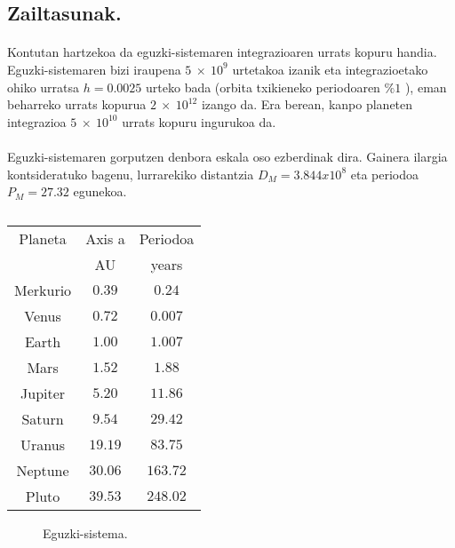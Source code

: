 \subsection{Zailtasunak.}

\paragraph*{} Kontutan hartzekoa da eguzki-sistemaren integrazioaren urrats kopuru handia. Eguzki-sistemaren bizi iraupena $5 \ \times \ 10^9$ urtetakoa izanik eta integrazioetako ohiko urratsa  $h=0.0025$ urteko bada (orbita txikieneko periodoaren $ \%1$ ), eman beharreko urrats kopurua $2 \ \times \ 10^{12}$ izango da. Era berean, kanpo planeten integrazioa $5 \ \times \ 10^{10}$ urrats kopuru ingurukoa da.     

\paragraph{} Eguzki-sistemaren gorputzen denbora eskala oso ezberdinak dira. Gainera ilargia kontsideratuko bagenu, lurrarekiko distantzia $D_M=3.844 x 10^8$ eta periodoa $P_M=27.32$ egunekoa. 

\begin{table} [h!]
\caption{}
\label{tab:1}       %
\begin{tabular}{c c c} 
\hline
 Planeta   &  Axis a        & Periodoa    \\   
           &   AU          &   years      \\ \hline
 Merkurio  &   $0.39$      &  $0.24$     \\
 Venus     &   $0.72$      &  $0.007$    \\
 Earth     &   $1.00$      &  $1.007$    \\
 Mars      &   $1.52$      &  $1.88$     \\ \hline
 Jupiter   &   $5.20$      &  $11.86$    \\
 Saturn    &   $9.54$      &  $29.42$    \\
 Uranus    &   $19.19$     &  $83.75$    \\
 Neptune   &   $30.06$     &  $163.72$    \\
 Pluto     &   $39.53$     &  $248.02$    \\
\hline
\end{tabular}
\end{table}

\begin{figure}[h]
\centering
{}
\caption{ \small Eguzki-sistema.}
\label{fig:eguzki-sistema}
\end{figure}


